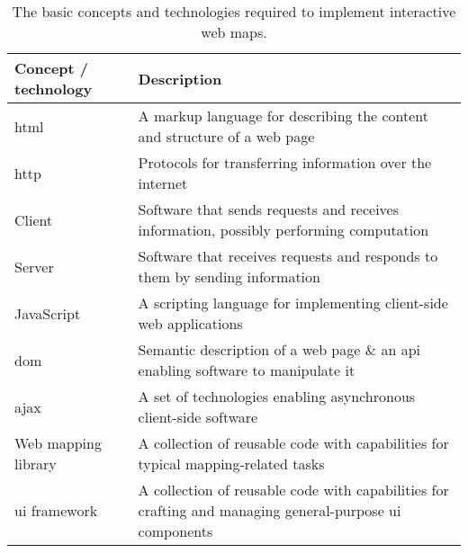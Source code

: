 \begin{table}[H]
	\caption{
		The basic concepts and technologies required to implement interactive web maps.
	}
	\label{tab:web tech}
	\centering
	\begin{tabular}{ | L{0.15\textwidth} | L{0.75\textwidth} | }
		\hline
		\textbf{Concept / technology}
		& \textbf{Description} \\
		\hline
		\hline
		\acrshort{html}
		& A markup language for describing the content and structure of a web page \\
		\hline
		\acrshort{http}
		& Protocols for transferring information over the internet \\
		\hline
		Client
		& Software that sends requests and receives information, possibly performing computation \\
		\hline
		Server
		& Software that receives requests and responds to them by sending information \\
		\hline
		JavaScript
		& A scripting language for implementing client-side web applications \\
		\hline
		\acrshort{dom}
		& Semantic description of a web page \&
		an \acrshort{api} enabling software to manipulate it \\
		\hline
		\acrshort{ajax}
		& A set of technologies enabling asynchronous client-side software \\
		\hline
		Web mapping library
		& A collection of reusable code with capabilities for typical mapping-related tasks \\
		\hline
		\acrshort{ui} framework
		& A collection of reusable code with capabilities for
		crafting and managing general-purpose \acrshort{ui} components \\
		\hline
	\end{tabular}
\end{table}
